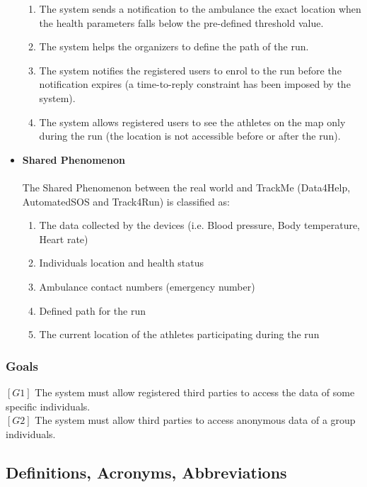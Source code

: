 \documentclass[12pt]{article}
\begin{document}
\begin{itemize}
\begin{enumerate}
\item{} The system sends a notification to the ambulance the exact location when the health parameters falls below the pre-defined threshold value.
\item{} The system helps the organizers to define the path of the run.
\item{} The system notifies the registered users to enrol to the run before the notification expires (a time-to-reply constraint has been imposed by the system).
\item{} The system allows registered users to see the athletes on the map only during the run (the location is not accessible before or after the run).
\end{enumerate}
\item \textbf{Shared Phenomenon}
\\
\\
The Shared Phenomenon between the real world and TrackMe (Data4Help, AutomatedSOS and Track4Run) is classified as:
\begin{enumerate}
\item{} The data collected by the devices (i.e. Blood pressure, Body temperature, Heart rate)
\item{} Individuals location and health status
\item{} Ambulance contact numbers (emergency number)
\item{} Defined path for the run
\item{} The current location of the athletes participating during the run
\end{enumerate}
\end{itemize}

\subsubsection{Goals}
$[ G1 ]$ The system must allow registered third parties to access the data of some specific individuals.\\
$[ G2 ]$ The system must allow third parties to access anonymous data of a group individuals.

\subsection{Definitions, Acronyms, Abbreviations}
\end{document}
